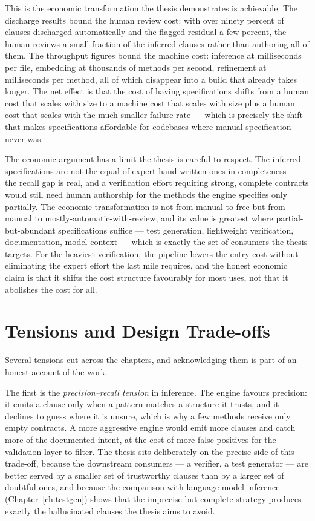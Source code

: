 This is the economic transformation the thesis demonstrates is achievable. The
discharge results bound the human review cost: with over ninety percent of clauses
discharged automatically and the flagged residual a few percent, the human reviews a
small fraction of the inferred clauses rather than authoring all of them. The
throughput figures bound the machine cost: inference at milliseconds per file,
embedding at thousands of methods per second, refinement at milliseconds per method,
all of which disappear into a build that already takes longer. The net effect is that
the cost of having specifications shifts from a human cost that scales with size to a
machine cost that scales with size plus a human cost that scales with the much
smaller failure rate --- which is precisely the shift that makes specifications
affordable for codebases where manual specification never was.

The economic argument has a limit the thesis is careful to respect. The inferred
specifications are not the equal of expert hand-written ones in completeness --- the
recall gap is real, and a verification effort requiring strong, complete contracts
would still need human authorship for the methods the engine specifies only
partially. The economic transformation is not from manual to free but from manual to
mostly-automatic-with-review, and its value is greatest where partial-but-abundant
specifications suffice --- test generation, lightweight verification, documentation,
model context --- which is exactly the set of consumers the thesis targets. For the
heaviest verification, the pipeline lowers the entry cost without eliminating the
expert effort the last mile requires, and the honest economic claim is that it
shifts the cost structure favourably for most uses, not that it abolishes the cost
for all.

\section{Tensions and Design Trade-offs}
\label{sec:syn-tensions}

Several tensions cut across the chapters, and acknowledging them is part of an
honest account of the work.

The first is the \emph{precision--recall tension} in inference. The engine
favours precision: it emits a clause only when a pattern matches a structure it
trusts, and it declines to guess where it is unsure, which is why a few methods
receive only empty contracts. A more aggressive engine would emit more clauses
and catch more of the documented intent, at the cost of more false positives for
the validation layer to filter. The thesis sits deliberately on the precise side
of this trade-off, because the downstream consumers --- a verifier, a test
generator --- are better served by a smaller set of trustworthy clauses than by a
larger set of doubtful ones, and because the comparison with language-model
inference (Chapter~\ref{ch:testgen}) shows that the imprecise-but-complete
strategy produces exactly the hallucinated clauses the thesis aims to avoid.

